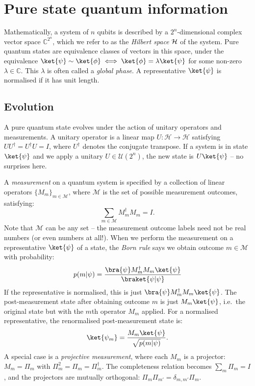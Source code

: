\section{Pure state quantum information}\label{sec:qubit_quantum_info}

Mathematically, a system of $n$ qubits is described by a $2^n$-dimensional complex vector space $\mathbb{C}^{2^n}$, which we refer to as the \emph{Hilbert space} $\mathcal{H}$ of the system.
Pure quantum states are equivalence classes of vectors in this space, under the equivalence $\ket{\psi} \sim \ket{\phi} \iff \ket{\phi} = \lambda \ket{\psi}$ for some non-zero $\lambda \in \mathbb{C}$.
This $\lambda$ is often called a \textit{global phase}.
A representative $\ket{\psi}$ is normalised if it has unit length.

\subsection{Evolution}

A pure quantum state evolves under the action of unitary operators and measurements.
A unitary operator is a linear map $U: \mathcal{H} \to \mathcal{H}$ satisfying $UU^\dagger = U^\dagger U = I$,
where $U^\dagger$ denotes the conjugate transpose.
If a system is in state $\ket{\psi}$ and we apply a unitary $U \in \mathcal{U}(2^n)$, the new state is $U\ket{\psi}$ -- no surprises here.

A \emph{measurement} on a quantum system is specified by a collection of linear operators $\{M_m\}_{m \in \mathcal{M}}$, where $\mathcal{M}$ is the set of possible measurement outcomes, satisfying:
\begin{equation}
    \sum_{m \in \mathcal{M}} M_m^\dagger M_m = I.
\end{equation}
Note that $\mathcal{M}$ can be any set -- the measurement outcome labels need not be real numbers (or even numbers at all!).
When we perform the measurement on a representative $\ket{\psi}$ of a state, the \textit{Born rule} says we obtain outcome $m \in \mathcal{M}$ with probability:
\begin{equation}\label{eq:born_rule}
    p(m | \psi) = \frac{\bra{\psi} M_m^\dagger M_m \ket{\psi}}{\braket{\psi | \psi}}
\end{equation}
If the representative is normalised, this is just $\bra{\psi} M_m^\dagger M_m \ket{\psi}$.
The post-measurement state after obtaining outcome $m$ is just $M_m \ket{\psi}$, i.e.\ the original state but with the $m$th operator $M_m$ applied.
For a normalised representative, the renormalised post-measurement state is:
\begin{equation}
    \ket{\psi_m} = \frac{M_m \ket{\psi}}{\sqrt{p(m | \psi)}}.
\end{equation}
A special case is a \emph{projective measurement}, where each $M_m$ is a projector: $M_m = \Pi_m$ with $\Pi_m^2 = \Pi_m = \Pi_m^\dagger$.
The completeness relation becomes $\sum_{m} \Pi_m = I$, and the projectors are mutually orthogonal: $\Pi_m \Pi_{m'} = \delta_{m,m'} \Pi_m$.

